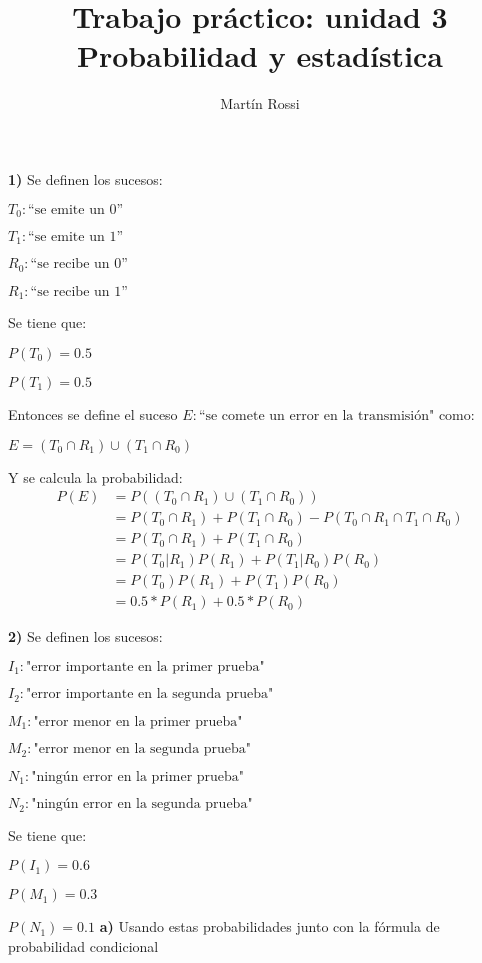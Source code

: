 \documentclass[12pt]{article}
\title{\LARGE \textbf{Trabajo práctico: unidad 3}\\\large Probabilidad y estadística}
\author{Martín Rossi}
\date{}
\begin{document}
\maketitle
\textbf{1)}
Se definen los sucesos:

$T_0:\textrm{``se emite un 0''}$

$T_1:\textrm{``se emite un 1''}$

$R_0:\textrm{``se recibe un 0''}$

$R_1:\textrm{``se recibe un 1''}$

Se tiene que:

$P(T_0)=0.5$

$P(T_1)=0.5$

Entonces se define el suceso $E:\textrm{``se comete un error en la transmisión"}$ como:

$E=(T_0 \cap R_1) \cup (T_1 \cap R_0)$

Y se calcula la probabilidad:
\begin{align*}
  P(E)&=P((T_0 \cap R_1) \cup (T_1 \cap R_0))\\
      &=P(T_0 \cap R_1)+P(T_1 \cap R_0)-P(T_0 \cap R_1 \cap T_1 \cap R_0)\\
      &=P(T_0 \cap R_1)+P(T_1 \cap R_0)\tag{$T_0$ y $T_1$ excluyentes}\\
      &=P(T_0|R_1)P(R_1)+P(T_1|R_0)P(R_0)\\
      &=P(T_0)P(R_1)+P(T_1)P(R_0)\tag{si se asume independencia entre $R$ y $T$}\\
      &=0.5*P(R_1)+0.5*P(R_0)
\end{align*}

\textbf{2)}
Se definen los sucesos:

$I_1: \textrm{"error importante en la primer prueba"}$

$I_2: \textrm{"error importante en la segunda prueba"}$

$M_1: \textrm{"error menor en la primer prueba"}$

$M_2: \textrm{"error menor en la segunda prueba"}$

$N_1: \textrm{"ningún error en la primer prueba"}$

$N_2: \textrm{"ningún error en la segunda prueba"}$

Se tiene que:

$P(I_1)=0.6$

$P(M_1)=0.3$

$P(N_1)=0.1$
\newpage
\textbf{a)}
Usando estas probabilidades junto con la fórmula de probabilidad condicional
\end{document}
